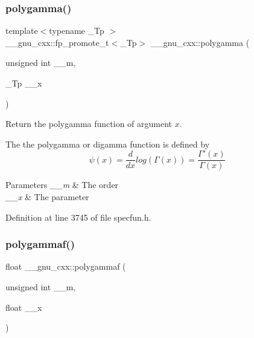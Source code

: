 \subsubsection{\texorpdfstring{polygamma()}{polygamma()}}
{\footnotesize\ttfamily template$<$typename \+\_\+\+Tp $>$ \\
\+\_\+\+\_\+gnu\+\_\+cxx\+::fp\+\_\+promote\+\_\+t$<$\+\_\+\+Tp$>$ \+\_\+\+\_\+gnu\+\_\+cxx\+::polygamma (\begin{DoxyParamCaption}\item[{unsigned int}]{\+\_\+\+\_\+m,  }\item[{\+\_\+\+Tp}]{\+\_\+\+\_\+x }\end{DoxyParamCaption})\hspace{0.3cm}{\ttfamily [inline]}}

Return the polygamma function of argument $ x $.

The the polygamma or digamma function is defined by \[ \psi(x) = \frac{d}{dx}log\left(\Gamma(x)\right) = \frac{\Gamma'(x)}{\Gamma(x)} \]


\begin{DoxyParams}{Parameters}
{\em \+\_\+\+\_\+m} & The order \\
\hline
{\em \+\_\+\+\_\+x} & The parameter \\
\hline
\end{DoxyParams}


Definition at line 3745 of file specfun.\+h.

\mbox{\label{group__gnu__math__spec__func_ga91861fadef76d4f73afacffcac66e312}} 
\subsubsection{\texorpdfstring{polygammaf()}{polygammaf()}}
{\footnotesize\ttfamily float \+\_\+\+\_\+gnu\+\_\+cxx\+::polygammaf (\begin{DoxyParamCaption}\item[{unsigned int}]{\+\_\+\+\_\+m,  }\item[{float}]{\+\_\+\+\_\+x }\end{DoxyParamCaption})\hspace{0.3cm}{\ttfamily [inline]}}

